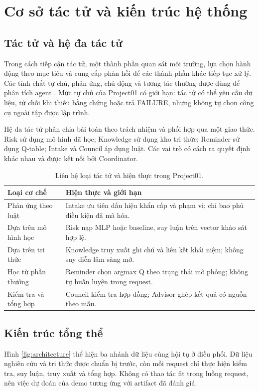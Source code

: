 \chapter{Cơ sở tác tử và kiến trúc hệ thống}
\section{Tác tử và hệ đa tác tử}
Trong cách tiếp cận tác tử, một thành phần quan sát môi trường, lựa chọn hành động theo mục tiêu và cung cấp phản hồi để các thành phần khác tiếp tục xử lý. Các tính chất tự chủ, phản ứng, chủ động và tương tác thường được dùng để phân tích agent \cite{wooldridge}. Mức tự chủ của Project01 có giới hạn: tác tử có thể yêu cầu dữ liệu, từ chối khi thiếu bằng chứng hoặc trả FAILURE, nhưng không tự chọn công cụ ngoài tập được lập trình.

Hệ đa tác tử phân chia bài toán theo trách nhiệm và phối hợp qua một giao thức. Risk sử dụng mô hình đã học; Knowledge sử dụng kho tri thức; Reminder sử dụng Q-table; Intake và Council áp dụng luật. Các vai trò có cách ra quyết định khác nhau và được kết nối bởi Coordinator.

\begin{table}[H]\centering\small
\caption{Liên hệ loại tác tử và hiện thực trong Project01.}
\begin{tabularx}{\textwidth}{@{}p{3.5cm}Y@{}}\toprule
Loại cơ chế & Hiện thực và giới hạn \\\midrule
Phản ứng theo luật & Intake ưu tiên dấu hiệu khẩn cấp và phạm vi; chỉ bao phủ điều kiện đã mã hóa. \\
Dựa trên mô hình học & Risk nạp MLP hoặc baseline, suy luận trên vector khảo sát hợp lệ. \\
Dựa trên tri thức & Knowledge truy xuất ghi chú và liên kết khái niệm; không suy diễn lâm sàng mở. \\
Học từ phần thưởng & Reminder chọn argmax Q theo trạng thái mô phỏng; không tự huấn luyện trong request. \\
Kiểm tra và tổng hợp & Council kiểm tra hợp đồng; Advisor ghép kết quả có nguồn theo mẫu. \\\bottomrule
\end{tabularx}
\end{table}

\section{Kiến trúc tổng thể}
Hình \ref{fig:architecture} thể hiện ba nhánh dữ liệu cùng hội tụ ở điều phối. Dữ liệu nghiên cứu và tri thức được chuẩn bị trước, còn mỗi request chỉ thực hiện kiểm tra, suy luận, truy xuất và tổng hợp. Không có thao tác fit trong luồng request, nên việc dự đoán của demo tương ứng với artifact đã đánh giá.

